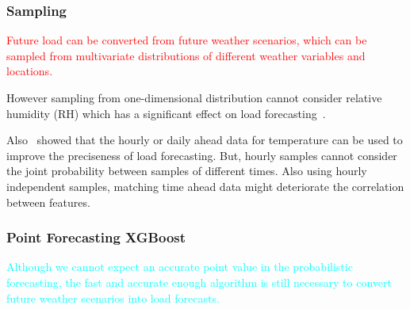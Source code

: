 \documentclass[journal]{IEEEtran} %
\begin{document}
\vspace{1in}







\subsubsection{Sampling}
\textcolor{red}{Future load can be converted from future weather scenarios, which can be sampled from multivariate distributions of different weather variables and locations.}



\vspace{1in}



However sampling from one-dimensional distribution cannot consider relative humidity (RH) which has a significant effect on load forecasting~\cite{Xie2016b}. 

Also~\cite{Xie2017a} showed that the hourly or daily ahead data for temperature can be used to improve the preciseness of load forecasting. But, hourly samples cannot consider the joint probability between samples of different times. Also using hourly independent samples, matching time ahead data might deteriorate the correlation between features.  












\subsubsection{Point Forecasting XGBoost}
\textcolor{cyan}{Although we cannot expect an accurate point value in the probabilistic forecasting, the fast and accurate enough algorithm is still necessary to convert future weather scenarios into load forecasts.}



\vspace{1.3in}
\end{document}
